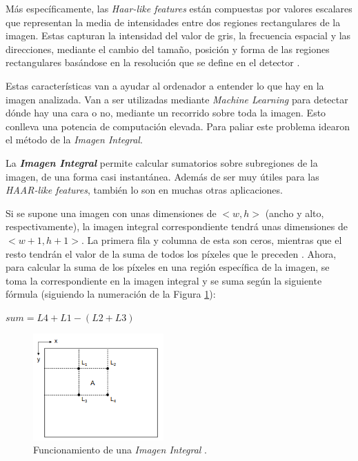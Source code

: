 Más específicamente, las \textit{Haar-like features} están compuestas por valores escalares que representan la media de intensidades entre dos regiones rectangulares de la imagen. Estas capturan la intensidad del valor de gris, la frecuencia espacial y las direcciones, mediante el cambio del tamaño, posición y forma de las regiones rectangulares basándose en la resolución que se define en el detector \cite{haar-like}. 

Estas características van a ayudar al ordenador a entender lo que hay en la imagen analizada. Van a ser utilizadas mediante \textit{Machine Learning} para detectar dónde hay una cara o no, mediante un recorrido sobre toda la imagen. Esto conlleva una potencia de computación elevada. Para paliar este problema idearon el método de la \textit{Imagen Integral}.

La \textbf{\textit{Imagen Integral}} permite calcular sumatorios sobre subregiones de la imagen, de una forma casi instantánea. Además de ser muy útiles para las \textit{HAAR-like features}, también lo son en muchas otras aplicaciones.

Si se supone una imagen con unas dimensiones de $<w,h>$ (ancho y alto, respectivamente), la imagen integral correspondiente tendrá unas dimensiones de $<w+1,h+1>$. La primera fila y columna de esta son ceros, mientras que el resto tendrán el valor de la suma de todos los píxeles que le preceden \cite{integral-web}. Ahora, para calcular la suma de los píxeles en una región específica de la imagen, se toma la correspondiente en la imagen integral y se suma según la siguiente fórmula (siguiendo la numeración de la Figura \ref{fig:integral}):
\begin{center}
	$sum = L4 + L1 - (L2 + L3)$ 
\end{center}
\begin{figure}[htp]
	\centering
	\includegraphics[width=5cm]{imagenes/integral.png}
	\caption[Funcionamiento de una \textit{Imagen Integral}]{Funcionamiento de una \textit{Imagen Integral} \cite{integral-web}.}
	\label{fig:integral}
\end{figure}

